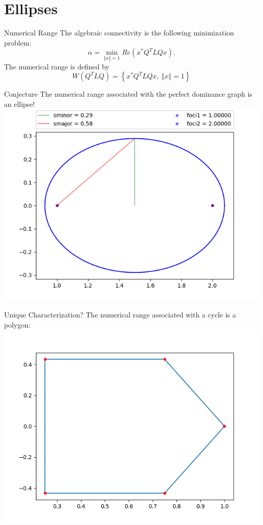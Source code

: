 \documentclass{beamer}
\newcommand\norm[1]{\left\Vert#1\right\Vert}
\begin{document}
\section{Ellipses}

\begin{frame}{Numerical Range}
The algebraic connectivity is the following minimization problem:
\[
\alpha = \min_{\norm{x}=1}Re(x^{*}Q^{T}LQx).
\]
\vfill
The numerical range is defined by
\[
W(Q^{T}LQ) = \left\{x^{*}Q^{T}LQx,~\norm{x}=1\right\}
\]
\end{frame}

\begin{frame}{Conjecture}
The numerical range associated with the perfect dominance graph is an ellipse!
\vfill
\centering
\includegraphics[scale=0.5]{figures/nr_dom1}
\end{frame}

\begin{frame}{Unique Characterization?}
The numerical range associated with a cycle is a polygon:
\vfill
\centering
\includegraphics[scale=0.5]{figures/nr_cycle1}
\end{frame}
\end{document}
